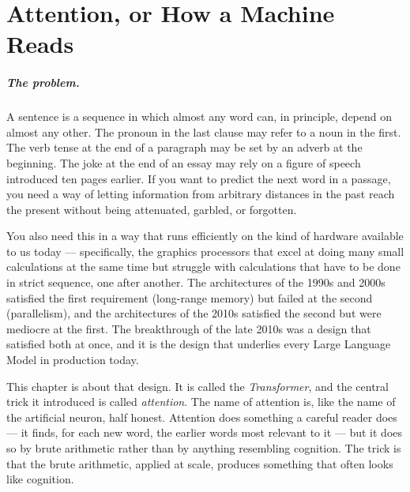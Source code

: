 
\chapter{Attention, or How a Machine Reads}
\label{chap:transformer}
\label{ntg:ch5}

\scenelabel
\begin{scenestrip}
\end{scenestrip}

\paragraph{The problem.} A sentence is a sequence in which almost any word can, in
principle, depend on almost any other. The pronoun in the last
clause may refer to a noun in the first. The verb tense at the
end of a paragraph may be set by an adverb at the beginning. The
joke at the end of an essay may rely on a figure of speech
introduced ten pages earlier. If you want to predict the next
word in a passage, you need a way of letting information from
arbitrary distances in the past reach the present without being
attenuated, garbled, or forgotten.

You also need this in a way that runs efficiently on the kind of
hardware available to us today --- specifically, the graphics
processors that excel at doing many small calculations at the
same time but struggle with calculations that have to be done in
strict sequence, one after another. The architectures of the
1990s and 2000s satisfied the first requirement (long-range
memory) but failed at the second (parallelism), and the
architectures of the 2010s satisfied the second but were
mediocre at the first. The breakthrough of the late 2010s was a
design that satisfied both at once, and it is the design that
underlies every Large Language Model in production today.

This chapter is about that design. It is called the
\emph{Transformer}, and the central trick it introduced is
called \emph{attention}. The name of attention is, like the
name of the artificial neuron, half honest. Attention does
something a careful reader does --- it finds, for each new word,
the earlier words most relevant to it --- but it does so by
brute arithmetic rather than by anything resembling cognition.
The trick is that the brute arithmetic, applied at scale,
produces something that often looks like cognition.

